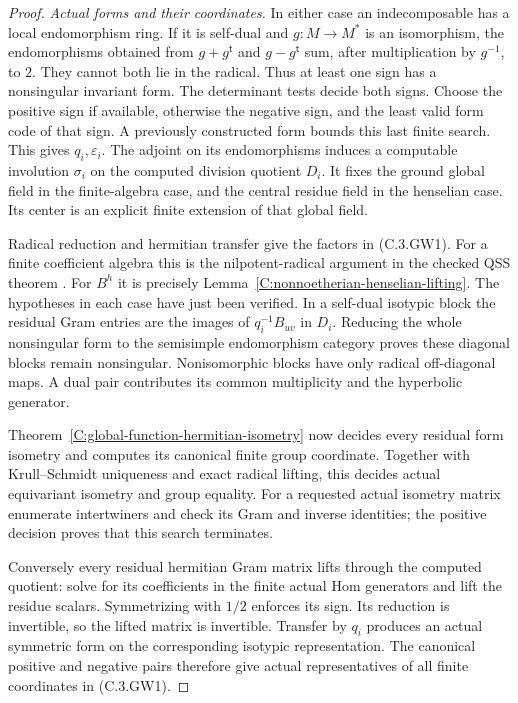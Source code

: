\begin{proof}
\emph{Actual forms and their coordinates.}
In either case an indecomposable
has a local endomorphism ring.
If it is self-dual and
$g:M\to M^*$ is an isomorphism,
the endomorphisms obtained from
$g+g^{\mathsf t}$ and
$g-g^{\mathsf t}$ sum, after
multiplication by $g^{-1}$,
to $2$.
They cannot both lie in the
radical.
Thus at least one sign has a
nonsingular invariant form.
The determinant tests decide
both signs.
Choose the positive sign if
available, otherwise the negative
sign, and the least valid form
code of that sign.
A previously constructed form
bounds this last finite search.
This gives $q_i,\varepsilon_i$.
The adjoint on its endomorphisms
induces a computable involution
$\sigma_i$ on the computed
division quotient $D_i$.
It fixes the ground global
field in the finite-algebra
case, and the central residue
field in the henselian case.
Its center is an explicit finite
extension of that global field.

Radical reduction and hermitian
transfer give the factors in
(C.3.GW1).
For a finite coefficient algebra
this is the nilpotent-radical
argument in the checked QSS
theorem
\cite[Propositions 2.4--2.5 and
Theorems 3.2--3.3, pp.\ 271--273]
 {C-QSS1979}.
For $B^h$ it is precisely
Lemma~\ref{C:nonnoetherian-henselian-lifting}.
The hypotheses in each case
have just been verified.
In a self-dual isotypic block
the residual Gram entries are
the images of $q_i^{-1}B_{uv}$
in $D_i$.
Reducing the whole nonsingular
form to the semisimple
endomorphism category proves
these diagonal blocks remain
nonsingular.
Nonisomorphic blocks have
only radical off-diagonal maps.
A dual pair contributes its
common multiplicity and the
hyperbolic generator.

Theorem~\ref{C:global-function-hermitian-isometry}
now decides every residual
form isometry and computes
its canonical finite group
coordinate.
Together with Krull--Schmidt
uniqueness and exact radical
lifting, this decides actual
equivariant isometry and
group equality.
For a requested actual
isometry matrix enumerate
intertwiners and check its
Gram and inverse identities;
the positive decision proves
that this search terminates.

Conversely every residual
hermitian Gram matrix lifts
through the computed quotient:
solve for its coefficients in
the finite actual Hom generators
and lift the residue scalars.
Symmetrizing with $1/2$
enforces its sign.
Its reduction is invertible,
so the lifted matrix is
invertible.
Transfer by $q_i$ produces
an actual symmetric form on
the corresponding isotypic
representation.
The canonical positive and
negative pairs therefore give
actual representatives of all
finite coordinates in (C.3.GW1).


\end{proof}
